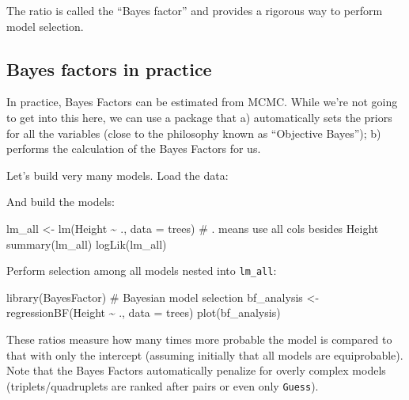 \documentclass[
  letterpaper,
  DIV=11,
  numbers=noendperiod]{scrreprt}
\newenvironment{Shaded}{\begin{snugshade}}{\end{snugshade}}
\newcommand{\NormalTok}[1]{\textcolor[rgb]{0.00,0.23,0.31}{#1}}
\begin{document}
The ratio is called the ``Bayes factor'' and provides a rigorous way to
perform model selection.

\subsection{Bayes factors in practice}\label{bayes-factors-in-practice}

In practice, Bayes Factors can be estimated from MCMC. While we're not
going to get into this here, we can use a package that a) automatically
sets the priors for all the variables (close to the philosophy known as
``Objective Bayes''); b) performs the calculation of the Bayes Factors
for us.

Let's build very many models. Load the data:

\begin{Shaded}
\end{Shaded}

And build the models:

\begin{Shaded}
\begin{Highlighting}[]
\NormalTok{lm\_all \textless{}{-} lm(Height \textasciitilde{} ., data = trees) \# . means use all cols besides Height}
\NormalTok{summary(lm\_all)}
\NormalTok{logLik(lm\_all)}
\end{Highlighting}
\end{Shaded}

Perform selection among all models nested into \texttt{lm\_all}:

\begin{Shaded}
\begin{Highlighting}[]
\NormalTok{library(BayesFactor) \# Bayesian model selection}
\NormalTok{bf\_analysis \textless{}{-} regressionBF(Height \textasciitilde{} ., data = trees)}
\NormalTok{plot(bf\_analysis)}
\end{Highlighting}
\end{Shaded}

These ratios measure how many times more probable the model is compared
to that with only the intercept (assuming initially that all models are
equiprobable). Note that the Bayes Factors automatically penalize for
overly complex models (triplets/quadruplets are ranked after pairs or
even only \texttt{Guess}).
\end{document}

